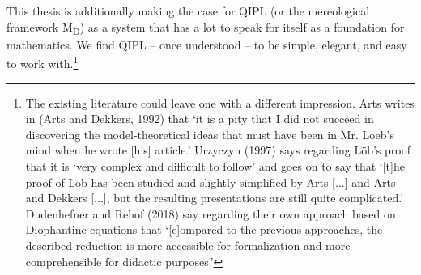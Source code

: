 \documentclass[12pt]{book}
\begin{document}
\begin{subappendices}
This thesis is additionally making the case for QIPL (or the mereological framework M\textsubscript{D}) as a system that has a lot to speak for itself as a foundation for mathematics. We find QIPL -- once understood -- to be simple, elegant, and easy to work with.\footnote{The existing literature could leave one with a different impression. Arts writes in (Arts and Dekkers, 1992) that ‘it is a pity that I did not succeed in
discovering the model-theoretical ideas that must have been in Mr. Loeb’s mind when he wrote [his] article.’ Urzyczyn (1997) says regarding Löb’s
proof that it is ‘very complex and difficult to follow’ and goes on to say
that ‘[t]he proof of Löb has been studied and slightly simplified by Arts
[...] and Arts and Dekkers [...], but the resulting presentations are still
quite complicated.’ Dudenhefner and Rehof (2018) say regarding their own
approach based on Diophantine equations that ‘[c]ompared to the previous
approaches, the described reduction is more accessible for formalization
and more comprehensible for didactic purposes.’}
\end{subappendices}
\end{document}
